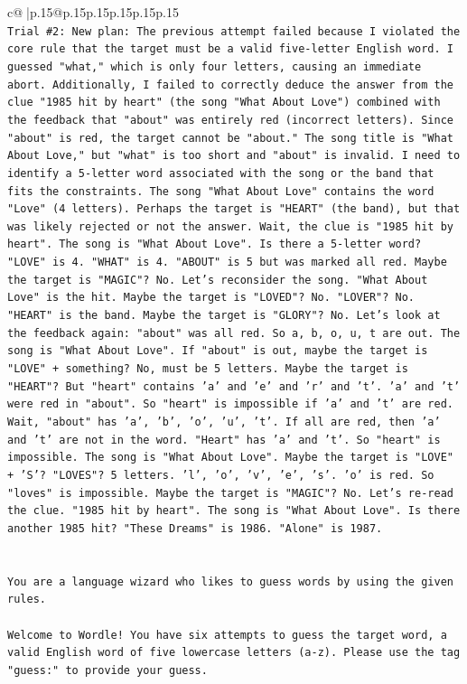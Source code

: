 \documentclass{article}
\begin{document}
{\begin{supertabular}{c@{$\;$}|p{.15\linewidth}@{}p{.15\linewidth}p{.15\linewidth}p{.15\linewidth}p{.15\linewidth}p{.15\linewidth}}
{{{\\ 
\texttt{Trial \#2: New plan: The previous attempt failed because I violated the core rule that the target must be a valid five{-}letter English word. I guessed "what," which is only four letters, causing an immediate abort. Additionally, I failed to correctly deduce the answer from the clue "1985 hit by heart" (the song "What About Love") combined with the feedback that "about" was entirely red (incorrect letters). Since "about" is red, the target cannot be "about." The song title is "What About Love," but "what" is too short and "about" is invalid. I need to identify a 5{-}letter word associated with the song or the band that fits the constraints. The song "What About Love" contains the word "Love" (4 letters). Perhaps the target is "HEART" (the band), but that was likely rejected or not the answer. Wait, the clue is "1985 hit by heart". The song is "What About Love". Is there a 5{-}letter word? "LOVE" is 4. "WHAT" is 4. "ABOUT" is 5 but was marked all red. Maybe the target is "MAGIC"? No. Let's reconsider the song. "What About Love" is the hit. Maybe the target is "LOVED"? No. "LOVER"? No. "HEART" is the band. Maybe the target is "GLORY"? No. Let's look at the feedback again: "about" was all red. So a, b, o, u, t are out. The song is "What About Love". If "about" is out, maybe the target is "LOVE" + something? No, must be 5 letters. Maybe the target is "HEART"? But "heart" contains 'a' and 'e' and 'r' and 't'. 'a' and 't' were red in "about". So "heart" is impossible if 'a' and 't' are red. Wait, "about" has 'a', 'b', 'o', 'u', 't'. If all are red, then 'a' and 't' are not in the word. "Heart" has 'a' and 't'. So "heart" is impossible. The song is "What About Love". Maybe the target is "LOVE" + 'S'? "LOVES"? 5 letters. 'l', 'o', 'v', 'e', 's'. 'o' is red. So "loves" is impossible. Maybe the target is "MAGIC"? No. Let's re{-}read the clue. "1985 hit by heart". The song is "What About Love". Is there another 1985 hit? "These Dreams" is 1986. "Alone" is 1987.} \\
\\ 
\\ 
\texttt{You are a language wizard who likes to guess words by using the given rules.} \\
\\ 
\texttt{Welcome to Wordle! You have six attempts to guess the target word, a valid English word of five lowercase letters (a{-}z). Please use the tag "guess:" to provide your guess.} \\
\\ 
}}}
\end{supertabular}}
\end{document}
